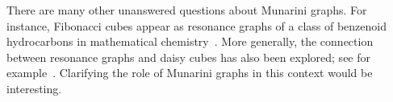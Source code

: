 \documentclass[11pt]{article}
\begin{document}
There are many other unanswered questions about Munarini graphs.  For instance, Fibonacci cubes appear as resonance graphs of a class of benzenoid hydrocarbons in mathematical chemistry~\cite{KZ-2005a}. More generally, the connection between resonance graphs and daisy cubes has also been explored; see for example~\cite{Z-2018}. Clarifying the role of Munarini graphs in this context would be interesting.
%
%
%
%
%
%
%
%
%
%
%
  

  
\end{document}
